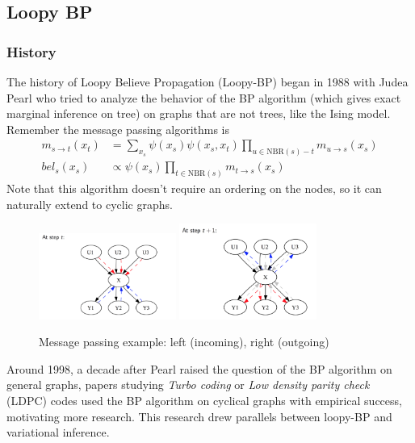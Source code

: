 \documentclass{article}
\begin{document}

\subsection{Loopy BP}
\subsubsection{History} The history of Loopy Believe Propagation (Loopy-BP) began in 1988 with Judea Pearl who tried to analyze the behavior of the BP algorithm (which gives exact marginal inference on tree) on graphs that are not trees, like the Ising model. Remember the message passing algorithms is
\begin{align*}
	m_{s\to t}(x_t) &= \sum_{x_s}\psi(x_s)\psi(x_s,x_t)\prod_{u\in \text{NBR}(s)-t}m_{u\to s}(x_s)\\
	bel_s(x_s) &\propto \psi(x_s)\prod_{t\in \text{NBR}(s)}m_{t\to s}(x_s)
\end{align*}
Note that this algorithm doesn't require an ordering on the nodes, so it can naturally extend to cyclic graphs.

\FloatBarrier
\begin{figure}
\center
\includegraphics[width=0.4\textwidth]{time_t}
\includegraphics[width=0.4\textwidth]{time_t1}
\caption{Message passing example: left (incoming), right (outgoing)}
\end{figure}

Around 1998, a decade after Pearl raised the question of the BP algorithm on general graphs, papers studying \emph{Turbo coding} or \emph{Low density parity check} (LDPC) codes used the BP algorithm on cyclical graphs with empirical success, motivating more research. This research drew parallels between loopy-BP and variational inference.
\end{document}
